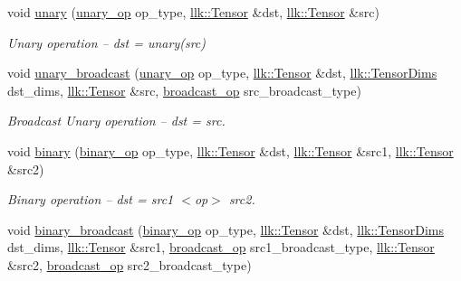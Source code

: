 \begin{DoxyCompactItemize}
void \hyperlink{namespacellk_1_1tensor__ops_a9727143b8fd7719345cbfd05a3fafb35}{unary} (\hyperlink{namespacellk_1_1tensor__ops_a5fae70cbcf6cd7aadca4a04278614633}{unary\+\_\+op} op\+\_\+type, \hyperlink{classllk_1_1Tensor}{llk\+::\+Tensor} \&dst, \hyperlink{classllk_1_1Tensor}{llk\+::\+Tensor} \&src)
\begin{DoxyCompactList}\small\item\em Unary operation -- dst = unary(src) \end{DoxyCompactList}\item 
void \hyperlink{namespacellk_1_1tensor__ops_a4430dd9c877f3b6fef3fd296131db096}{unary\+\_\+broadcast} (\hyperlink{namespacellk_1_1tensor__ops_a5fae70cbcf6cd7aadca4a04278614633}{unary\+\_\+op} op\+\_\+type, \hyperlink{classllk_1_1Tensor}{llk\+::\+Tensor} \&dst, \hyperlink{structllk_1_1TensorDims}{llk\+::\+Tensor\+Dims} dst\+\_\+dims, \hyperlink{classllk_1_1Tensor}{llk\+::\+Tensor} \&src, \hyperlink{namespacellk_1_1tensor__ops_ac43a7c3eb367c669baaa45a327aeca58}{broadcast\+\_\+op} src\+\_\+broadcast\+\_\+type)
\begin{DoxyCompactList}\small\item\em Broadcast Unary operation -- dst = src. \end{DoxyCompactList}\item 
void \hyperlink{namespacellk_1_1tensor__ops_a97daba7fed93172c04f78497d2513e77}{binary} (\hyperlink{namespacellk_1_1tensor__ops_a255b8a4e49bc956c2731c62bf613c0f8}{binary\+\_\+op} op\+\_\+type, \hyperlink{classllk_1_1Tensor}{llk\+::\+Tensor} \&dst, \hyperlink{classllk_1_1Tensor}{llk\+::\+Tensor} \&src1, \hyperlink{classllk_1_1Tensor}{llk\+::\+Tensor} \&src2)
\begin{DoxyCompactList}\small\item\em Binary operation -- dst = src1 $<$op$>$ src2. \end{DoxyCompactList}\item 
void \hyperlink{namespacellk_1_1tensor__ops_aecac6c5bbeaf3abf3e5a3c7e325728bc}{binary\+\_\+broadcast} (\hyperlink{namespacellk_1_1tensor__ops_a255b8a4e49bc956c2731c62bf613c0f8}{binary\+\_\+op} op\+\_\+type, \hyperlink{classllk_1_1Tensor}{llk\+::\+Tensor} \&dst, \hyperlink{structllk_1_1TensorDims}{llk\+::\+Tensor\+Dims} dst\+\_\+dims, \hyperlink{classllk_1_1Tensor}{llk\+::\+Tensor} \&src1, \hyperlink{namespacellk_1_1tensor__ops_ac43a7c3eb367c669baaa45a327aeca58}{broadcast\+\_\+op} src1\+\_\+broadcast\+\_\+type, \hyperlink{classllk_1_1Tensor}{llk\+::\+Tensor} \&src2, \hyperlink{namespacellk_1_1tensor__ops_ac43a7c3eb367c669baaa45a327aeca58}{broadcast\+\_\+op} src2\+\_\+broadcast\+\_\+type)

\end{DoxyCompactItemize}
